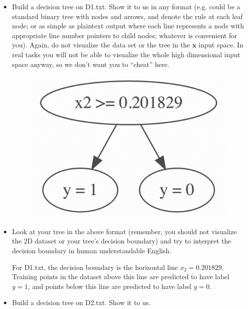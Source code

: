 \documentclass[a4paper]{article}
\theoremstyle{definition}
\def\x{\mathbf x}
\newenvironment{soln}{
    \leavevmode\color{blue}\ignorespaces
}{}
\begin{document}
\begin{enumerate}
\begin{itemize}
  \item Build a decision tree on D1.txt.  Show it to us in any format (e.g. could be a standard binary tree with nodes and arrows, and denote the rule at each leaf node; or as simple as plaintext output where each line represents a node with appropriate line number pointers to child nodes; whatever is convenient for you). Again, do not visualize the data set or the tree in the $\x$ input space.  In real tasks you will not be able to visualize the whole high dimensional input space anyway, so we don't want you to ``cheat'' here. \\
  
  \begin{figure}[htbp]
    \centerline{\includegraphics[scale=0.35]{Q5a.png}}
  \end{figure}

  \item Look at your tree in the above format (remember, you should not visualize the 2D dataset or your tree's decision boundary) and try to interpret the decision boundary in human understandable English. \\
  

  \begin{soln}
    For D1.txt, the decision boundary is the horizontal line $x_2 = 0.201829$. Training points in the dataset above this line are predicted to have label $y=1$, and points below this line are predicted to have label $y = 0$.
  \end{soln}

  \item Build a decision tree on D2.txt.  Show it to us. \\
  

\end{itemize}
\end{enumerate}
\end{document}
